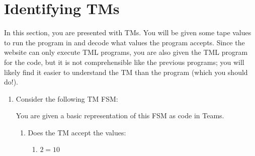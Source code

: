 \documentclass[answers]{exam}
\begin{document}
    \section{Identifying TMs}
    In this section, you are presented with TMs. You will be given some tape values to run the program in and decode what values the program accepts. Since the website can only execute TML programs, you are also given the TML program for the code, but it is not comprehensible like the previous programs; you will likely find it easier to understand the TM than the program (which you should do!). 
    \begin{enumerate}
        \item Consider the following TM FSM:
        \begin{figure}[H]
            \centering
        \end{figure}
        You are given a basic representation of this FSM as code in Teams.
        \begin{enumerate}
            \item Does the TM accept the values:
            \begin{enumerate}
                \item $2 = 10$
                \begin{solution}
                    
                \end{solution}
                

\end{enumerate}
\end{enumerate}
\end{enumerate}
\end{document}
